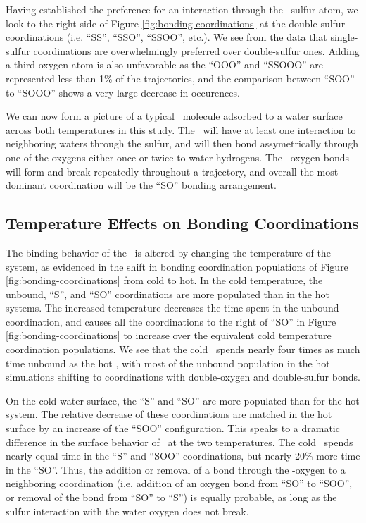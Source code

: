 Having established the preference for an interaction through the \suldiox~sulfur atom, we look to the right side of Figure \ref{fig:bonding-coordinations} at the double-sulfur coordinations (i.e. ``SS'', ``SSO'', ``SSOO'', etc.). We see from the data that single-sulfur coordinations are overwhelmingly preferred over double-sulfur ones. Adding a third oxygen atom is also unfavorable as the ``OOO'' and ``SSOOO'' are represented less than 1\% of the trajectories, and the comparison between ``SOO'' to ``SOOO'' shows a very large decrease in occurences.

We can now form a picture of a typical \suldiox~molecule adsorbed to a water surface across both temperatures in this study. The \suldiox~will have at least one interaction to neighboring waters through the sulfur, and will then bond assymetrically through one of the oxygens either once or twice to water hydrogens. The \suldiox~oxygen bonds will form and break repeatedly throughout a trajectory, and overall the most dominant coordination will be the ``SO'' bonding arrangement.


\subsection {Temperature Effects on Bonding Coordinations}

The binding behavior of the \suldiox~is altered by changing the temperature of the system, as evidenced in the shift in bonding coordination populations of Figure \ref{fig:bonding-coordinations} from cold to hot. In the cold temperature, the unbound, ``S'', and ``SO'' coordinations are more populated than in the hot systems. The increased temperature decreases the time spent in the unbound coordination, and causes all the coordinations to the right of ``SO'' in Figure \ref{fig:bonding-coordinations} to increase over the equivalent cold temperature coordination populations. We see that the cold \suldiox~spends nearly four times as much time unbound as the hot \suldiox, with most of the unbound population in the hot simulations shifting to coordinations with double-oxygen and double-sulfur bonds. 

On the cold water surface, the ``S'' and ``SO'' are more populated than for the hot system. The relative decrease of these coordinations are matched in the hot surface by an increase of the ``SOO'' configuration. This speaks to a dramatic difference in the surface behavior of \suldiox~at the two temperatures. The cold \suldiox~spends nearly equal time in the ``S'' and ``SOO'' coordinations, but nearly 20\% more time in the ``SO''. Thus, the addition or removal of a bond through the \suldiox-oxygen to a neighboring coordination (i.e. addition of an oxygen bond from ``SO'' to ``SOO'', or removal of the bond from ``SO'' to ``S'') is equally probable, as long as the sulfur interaction with the water oxygen does not break. 

